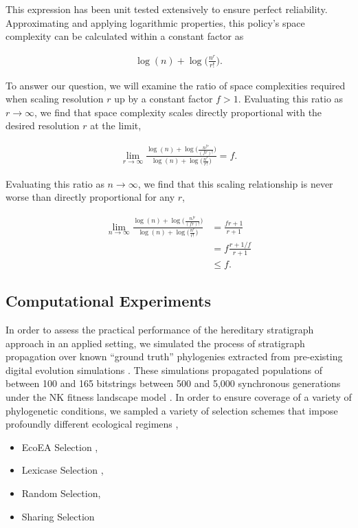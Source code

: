 This expression has been unit tested extensively to ensure perfect reliability.
Approximating and applying logarithmic properties, this policy's space complexity can be calculated within a constant factor as

\begin{align*}
\log(n) + \log\Big(\frac{n^r}{r!}\Big).
\end{align*}

To answer our question, we will examine the ratio of space complexities required when scaling resolution $r$ up by a constant factor $f > 1$.
Evaluating this ratio as $r \to \infty$, we find that space complexity scales directly proportional with the desired resolution $r$ at the limit,

\begin{align*}
\lim_{r \to \infty}
\frac{
  \log(n) + \log\Big(\frac{n^{fr}}{(fr)!}\Big)
}{
  \log(n) + \log\Big(\frac{n^r}{r!}\Big)
}
= f.
\end{align*}

Evaluating this ratio as $n \to \infty$, we find that this scaling relationship is never worse than directly proportional for any $r$,

\begin{align*}
\lim_{n \to \infty}
\frac{
  \log(n) + \log\Big(\frac{n^{fr}}{(fr)!}\Big)
}{
  \log(n) + \log\Big(\frac{n^r}{r!}\Big)
}
&= \frac{fr+1}{r+1}\\
&= f\frac{r + 1/f}{r + 1}\\
&\leq f.
\end{align*}


\subsection{Computational Experiments}

In order to assess the practical performance of the hereditary stratigraph approach in an applied setting, we simulated the process of stratigraph propagation over known ``ground truth'' phylogenies extracted from pre-existing digital evolution simulations \citep{hernandez2022phylogenetic}.
These simulations propagated populations of between 100 and 165 bitstrings between 500 and 5,000 synchronous generations under the NK fitness landscape model \citep{kauffman1989nk}.
In order to ensure coverage of a variety of phylogenetic conditions, we sampled a variety of selection schemes that impose profoundly different ecological regimens \citep{dolson2018ecological},
\begin{itemize}
  \item EcoEA Selection \citep{goings2012ecology},
  \item Lexicase Selection \citep{helmuth2014solving},
  \item Random Selection,
  \item Sharing Selection \citep{goldberg1987genetic}
\end{itemize}

